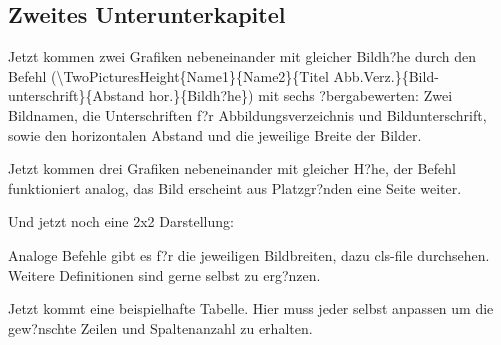



\subsection{Zweites Unterunterkapitel}\label{sucsec:zweites_unterunterkapitel}

Jetzt kommen zwei Grafiken nebeneinander mit gleicher Bildh?he durch den Befehl (\textbackslash TwoPicturesHeight\{Name1\}\{Name2\}\{Titel Abb.Verz.\}\{Bild-unterschrift\}\{Abstand hor.\}\{Bildh?he\}) mit sechs ?bergabewerten: Zwei Bildnamen, die Unterschriften f?r Abbildungsverzeichnis und Bildunterschrift, sowie den horizontalen Abstand und die jeweilige Breite der Bilder.



Jetzt kommen drei Grafiken nebeneinander mit gleicher H?he, der Befehl funktioniert analog, das Bild erscheint aus Platzgr?nden eine Seite weiter.\newpage


Und jetzt noch eine 2x2 Darstellung:


Analoge Befehle gibt es f?r die jeweiligen Bildbreiten, dazu cls-file durchsehen. Weitere Definitionen sind gerne selbst zu erg?nzen.

Jetzt kommt eine beispielhafte  Tabelle. Hier muss jeder selbst anpassen um die gew?nschte Zeilen und Spaltenanzahl zu erhalten.

